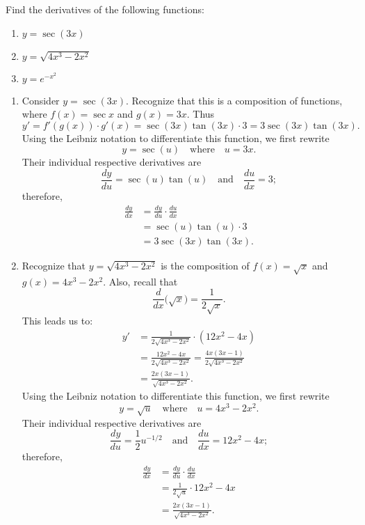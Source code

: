 \begin{example} \label{Ex:2.6.Eg5}
Find the derivatives of the following functions:
\begin{enumerate}[1)]
\item $y = \sec(3x)$
\item $y= \sqrt{4x^3-2x^2}$
\item $y = e^{-x^2}$
\end{enumerate}

\solution
\begin{enumerate}[1)]
\item Consider $y = \sec(3x)$. Recognize that this is a composition of functions, where $f(x) = \sec x$ and $g(x) = 3x$. Thus 
\[ y' = f'(g(x))\cdot g'(x) = \sec(3x)\tan(3x)\cdot 3 = 3\sec(3x)\tan(3x).\] 
Using the Leibniz notation to differentiate this function, we first rewrite
\[ y = \sec(u) \quad \mbox{where} \quad u = 3x. \]
Their individual respective derivatives are
\[ \frac{dy}{du} = \sec(u) \tan(u) \quad \mbox{and} \quad \frac{du}{dx} = 3; \]
therefore,
\begin{align*}
\frac{dy}{dx} &= \frac{dy}{du} \cdot \frac{du}{dx} \\
&= \sec(u) \tan(u) \cdot 3 \\
&= 3\sec(3x)\tan(3x).
\end{align*}
		
\item Recognize that $y = \sqrt{4x^3-2x^2}$ is the composition of $f(x) = \sqrt{x}$ and $g(x) = 4x^3-2x^2$. Also, recall that 
$$\frac{d}{dx}\Big(\sqrt{x}\Big) = \frac{1}{2\sqrt{x}}.$$ 
This leads us to:
\begin{align*}
y' &= \frac{1}{2\sqrt{4x^3-2x^2}} \cdot (12x^2-4x) \\
&= \frac{12x^2-4x}{2\sqrt{4x^3-2x^2}}= \frac{4x(3x-1)}{2\sqrt{4x^3-2x^2}} \\
&= \frac{2x(3x-1)}{\sqrt{4x^3-2x^2}}.
\end{align*}
Using the Leibniz notation to differentiate this function, we first rewrite
\[ y = \sqrt{u} \quad \mbox{where} \quad u = 4x^3-2x^2. \]
Their individual respective derivatives are
\[ \frac{dy}{du} = \frac{1}{2}u^{-1/2} \quad \mbox{and} \quad \frac{du}{dx} = 12x^2 - 4x; \]
therefore,
\begin{align*}
\frac{dy}{dx} &= \frac{dy}{du} \cdot \frac{du}{dx} \\
&= \frac{1}{2\sqrt{u}} \cdot 12x^2-4x \\
&= \frac{2x(3x-1)}{\sqrt{4x^3-2x^2}}.
\end{align*}
		

\end{enumerate}
\end{example}
